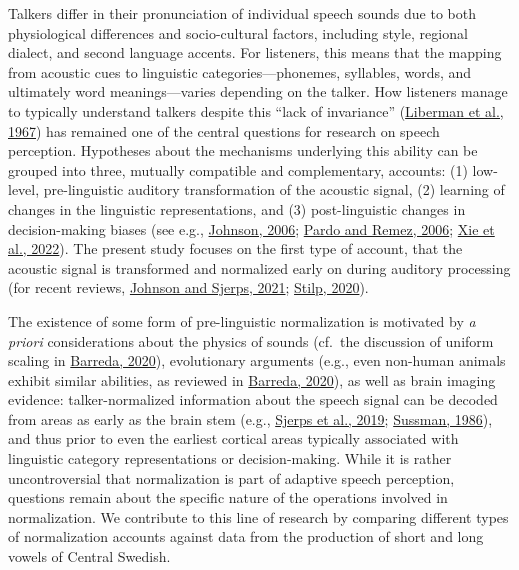\documentclass[utf8]{frontiersSCNS}
\begin{document}
Talkers differ in their pronunciation of individual speech sounds due to both physiological differences and socio-cultural factors, including style, regional dialect, and second language accents. For listeners, this means that the mapping from acoustic cues to linguistic categories---phonemes, syllables, words, and ultimately word meanings---varies depending on the talker. How listeners manage to typically understand talkers despite this ``lack of invariance'' (\protect\hyperlink{ref-liberman1967}{Liberman et al., 1967}) has remained one of the central questions for research on speech perception. Hypotheses about the mechanisms underlying this ability can be grouped into three, mutually compatible and complementary, accounts: (1) low-level, pre-linguistic auditory transformation of the acoustic signal, (2) learning of changes in the linguistic representations, and (3) post-linguistic changes in decision-making biases (see e.g., \protect\hyperlink{ref-johnson2006}{Johnson, 2006}; \protect\hyperlink{ref-pardo2006}{Pardo and Remez, 2006}; \protect\hyperlink{ref-xie2022}{Xie et al., 2022}). The present study focuses on the first type of account, that the acoustic signal is transformed and normalized early on during auditory processing (for recent reviews, \protect\hyperlink{ref-johnson-sjerps2021}{Johnson and Sjerps, 2021}; \protect\hyperlink{ref-stilp2020}{Stilp, 2020}).

The existence of some form of pre-linguistic normalization is motivated by \emph{a priori} considerations about the physics of sounds (cf.~the discussion of uniform scaling in \protect\hyperlink{ref-barreda2020a}{Barreda, 2020}), evolutionary arguments (e.g., even non-human animals exhibit similar abilities, as reviewed in \protect\hyperlink{ref-barreda2020a}{Barreda, 2020}), as well as brain imaging evidence: talker-normalized information about the speech signal can be decoded from areas as early as the brain stem (e.g., \protect\hyperlink{ref-sjerps2019}{Sjerps et al., 2019}; \protect\hyperlink{ref-sussman1986}{Sussman, 1986}), and thus prior to even the earliest cortical areas typically associated with linguistic category representations or decision-making. While it is rather uncontroversial that normalization is part of adaptive speech perception, questions remain about the specific nature of the operations involved in normalization. We contribute to this line of research by comparing different types of normalization accounts against data from the production of short and long vowels of Central Swedish.
\end{document}
